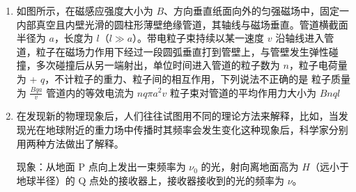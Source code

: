 \documentclass[\gkver]{gaokaozhenti}
\begin{document}
\begin{enumerate}
{B．第一宇宙速度是所有绕地球做圆周运动的卫星的最大环绕速度，则“夸父一号”的速度小于 $7.9 \Ukms$，故 B 错误；

C．根据 $G \frac{{Mm}}{{{r^2}}} = ma$，可知“夸父一号”绕地球做圆周运动的向心加速度小于地球表面的重力加速度，故 C 错误；

D．“夸父一号”绕地球转动，地球绕太阳转动，中心天体不同，则根据题中信息不能求解地球与太阳的距离，故 D 错误。

故选 A。
}

\item
如图所示，在磁感应强度大小为 $B$、方向垂直纸面向外的匀强磁场中，固定一内部真空且内壁光滑的圆柱形薄壁绝缘管道，其轴线与磁场垂直。管道横截面半径为 $a$，长度为 $l$（$l \gg a$）。带电粒子束持续以某一速度 $v$ 沿轴线进入管道，粒子在磁场力作用下经过一段圆弧垂直打到管壁上，与管壁发生弹性碰撞，多次碰撞后从另一端射出，单位时间进入管道的粒子数为 $n$，粒子电荷量为 + $q$，不计粒子的重力、粒子间的相互作用，下列说法不正确的是
{粒子质量为 $\frac{{Bqa}}{v}$}
{管道内的等效电流为 $nq\pi a^{2}v$}
{粒子束对管道的平均作用力大小为 $Bnql$}

\item
在发现新的物理现象后，人们往往试图用不同的理论方法来解释，比如，当发现光在地球附近的重力场中传播时其频率会发生变化这种现象后，科学家分别用两种方法做出了解释。

现象：从地面 P 点向上发出一束频率为 $\nu_{0}$ 的光，射向离地面高为 $H$（远小于地球半径）的 Q 点处的接收器上，接收器接收到的光的频率为 $\nu$。


\end{enumerate}
\end{document}
